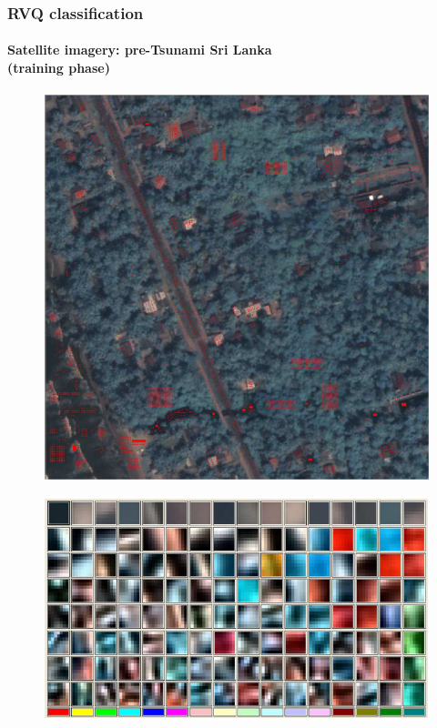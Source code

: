 \begin{frame}
\frametitle{RVQ classification}
\framesubtitle{\small Satellite imagery: pre-Tsunami Sri Lanka \\(training phase)}
\logoCSIPCPL\mypagenum
	\begin{figure}		
		\includegraphics[height=0.35\textheight]{thesis/RVQ_SatelliteSriLanka_1_snippets.png}			
	\end{figure}
	\begin{figure}		
		\includegraphics[height=0.40\textheight]{thesis/RVQ_SatelliteSriLanka_2_codebooks.png}			
	\end{figure}
\end{frame}




